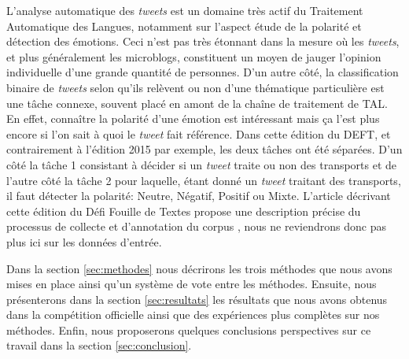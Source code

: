 
 L'analyse automatique des \textit{tweets} est un domaine très actif du Traitement Automatique des Langues, notamment sur l'aspect étude de la polarité et détection des émotions.
 Ceci n'est pas très étonnant dans la mesure où les \textit{tweets}, et plus généralement les microblogs, constituent un moyen de jauger l'opinion individuelle d'une grande quantité de personnes.
 D'un autre côté, la classification binaire de \textit{tweets} selon qu'ils relèvent ou non d'une thématique particulière est une tâche connexe, souvent placé en amont de la chaîne de traitement de TAL. En effet, connaître la polarité d'une émotion est intéressant mais ça l'est plus encore si l'on sait à quoi le \textit{tweet} fait référence.
 Dans cette édition du DEFT, et contrairement à l'édition 2015 par exemple, les deux tâches ont été séparées. D'un côté la tâche 1 consistant à décider si un \textit{tweet} traite ou non des transports et de l'autre côté la tâche 2 pour laquelle, étant donné un \textit{tweet} traitant des transports, il faut détecter la polarité: Neutre, Négatif, Positif ou Mixte.
 L'article décrivant cette édition du Défi Fouille de Textes propose une description précise du processus de collecte et d'annotation du corpus \cite{Paroubek-2018}, nous ne reviendrons donc pas plus ici sur les données d'entrée.

 Dans la section \ref{sec:methodes} nous décrirons les trois méthodes que nous avons mises en place ainsi qu'un système de vote entre les méthodes.
 Ensuite, nous présenterons dans la section \ref{sec:resultats} les résultats que nous avons obtenus dans la compétition officielle ainsi que des expériences plus complètes sur nos méthodes.
 Enfin, nous proposerons quelques conclusions perspectives sur ce travail dans la section \ref{sec:conclusion}.
 
